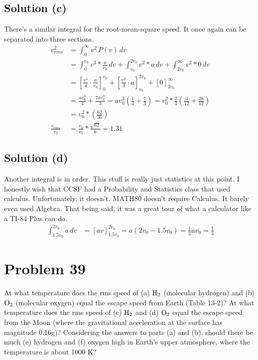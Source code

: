 \documentclass[12pt]{article}
\begin{document}
        \subsection{Solution (c)}
            There's a similar integral for the root-mean-square speed.
            It once again can be separated into three sections.
            \begin{align}
                v_{rms}^2   &=  \int_{0}^{\infty} v^2\,P(v)\,dv\\
                    &=  \int_{0}^{v_0} v^3 * \frac{a}{v_0}\,dv + \int_{v_0}^{2v_0} v^2 * a \,dv + \int_{2v_0}^{\infty} v^2 * 0\,dv\\
                    &=  \left[ \frac{v^4}{4} \cdot \frac{a}{v_0} \right]_{0}^{v_0}
                        +   \left[ \frac{v^3}{3} \cdot a \right]_{v_0}^{2v_0}
                        +   \left[ 0 \right]_{2v_0}^{\infty}\\
                    &=  \frac{av_0^3}{4} + \frac{7av_0^3}{3}
                    =   av_0^3 \left( \frac{1}{4} + \frac{7}{3} \right)
                    =   v_0^2 * \frac{2}{3} \left( \frac{3}{12} + \frac{28}{12} \right)\\
                    &=  v_0^2 * \left( \frac{62}{36} \right)\\
                \frac{v_{rms}}{v_0} &=  \frac{v_0}{v_0} * \frac{\sqrt{62}}{6}
                    =   \boxed{1.31}
            \end{align}

        \subsection{Solution (d)}
            Another integral is in order.
            This stuff is really just statistics at this point.
            I honestly wish that CCSF had a Probability and Statistics class that used calculus.
            Unfortunately, it doesn't.
            MATH80 doesn't require Calculus. 
            It barely even used Algebra.
            That being said, it was a great tour of what a calculator like a TI-84 Plus can do.
            \begin{align}
                \int_{1.5v_0}^{2v_0} a\,dv  &=  \left[ av \right]_{1.5v_0}^{2v_0}
                    =   a(2v_0 - 1.5v_0)
                    =   \frac{1}{2}av_0
                    =   \boxed{\frac{1}{3}}
            \end{align}

    \pagebreak
    \section{Problem 39}
        At what temperature does the rms speed of (a) $\rm H_2$ (molecular hydrogen) and (b) $\rm O_2$ (molecular oxygen) equal the escape speed from Earth (Table 13-2)? 
        At what temperature does the rms speed of (c) $\rm H_2$ and (d) $\rm O_2$ equal the escape speed from the Moon (where the gravitational acceleration at the surface has magnitude 0.16g)? 
        Considering the answers to parts (a) and (b), should there be much (e) hydrogen and (f) oxygen high in Earth's upper atmosphere, where the temperature is about 1000 K?
\end{document}
